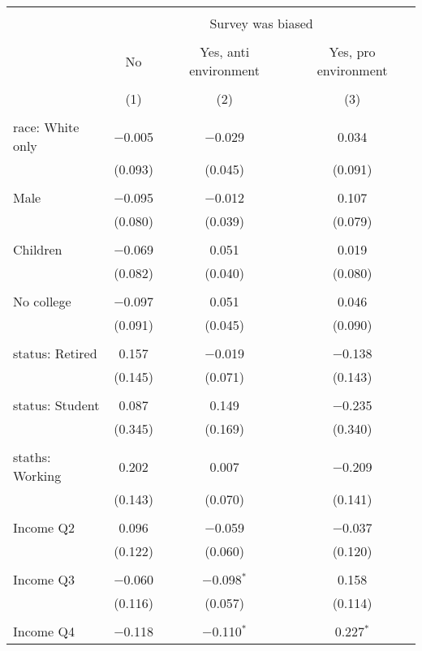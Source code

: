 
\begin{tabular}{@{\extracolsep{5pt}}lccc} 
\\[-1.8ex]\hline 
\hline \\[-1.8ex] 
 & \multicolumn{3}{c}{Survey was biased} \\ 
\cline{2-4} 
\\[-1.8ex] & No & Yes, anti environment & Yes, pro environment \\ 
\\[-1.8ex] & (1) & (2) & (3)\\ 
\hline \\[-1.8ex] 
 race: White only & $-$0.005 & $-$0.029 & 0.034 \\ 
  & (0.093) & (0.045) & (0.091) \\ 
  & & & \\ 
 Male & $-$0.095 & $-$0.012 & 0.107 \\ 
  & (0.080) & (0.039) & (0.079) \\ 
  & & & \\ 
 Children & $-$0.069 & 0.051 & 0.019 \\ 
  & (0.082) & (0.040) & (0.080) \\ 
  & & & \\ 
 No college & $-$0.097 & 0.051 & 0.046 \\ 
  & (0.091) & (0.045) & (0.090) \\ 
  & & & \\ 
 status: Retired & 0.157 & $-$0.019 & $-$0.138 \\ 
  & (0.145) & (0.071) & (0.143) \\ 
  & & & \\ 
 status: Student & 0.087 & 0.149 & $-$0.235 \\ 
  & (0.345) & (0.169) & (0.340) \\ 
  & & & \\ 
 staths: Working & 0.202 & 0.007 & $-$0.209 \\ 
  & (0.143) & (0.070) & (0.141) \\ 
  & & & \\ 
 Income Q2 & 0.096 & $-$0.059 & $-$0.037 \\ 
  & (0.122) & (0.060) & (0.120) \\ 
  & & & \\ 
 Income Q3 & $-$0.060 & $-$0.098$^{*}$ & 0.158 \\ 
  & (0.116) & (0.057) & (0.114) \\ 
  & & & \\ 
 Income Q4 & $-$0.118 & $-$0.110$^{*}$ & 0.227$^{*}$ \\ 

\end{tabular}
